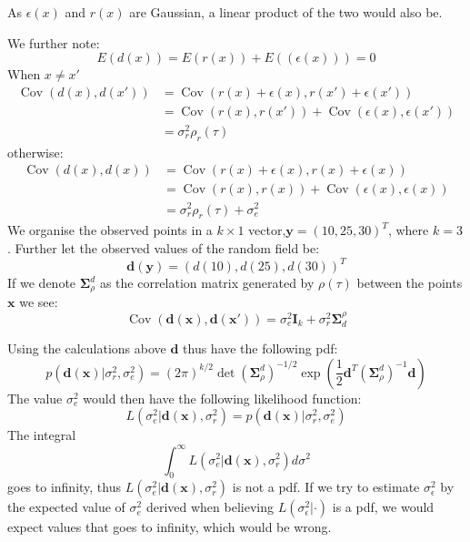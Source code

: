 \documentclass[]{article}
\newcommand{\vect}[1]{\ensuremath{\boldsymbol{\mathbf{#1}}}}
\newcommand{\matr}[1]{\ensuremath{\boldsymbol{\mathbf{#1}}}}
\DeclareMathOperator{\Cov}{\text{Cov}}
\begin{document}
As \(\epsilon(x)\) and \(r(x)\) are Gaussian, a linear product of the
two would also be.

We further note: \begin{equation}
    E(d(x)) = E(r(x)) + E((\epsilon(x))) = 0
\end{equation} When \(x\neq x'\) \begin{equation*}
    \begin{split}
        \Cov(d(x), d(x')) &= \Cov(r(x)+\epsilon(x), r(x') + \epsilon(x')) \\
        &= \Cov(r(x), r(x')) + \Cov(\epsilon(x), \epsilon(x')) \\
        &= \sigma_r^2\rho_r(\tau)
    \end{split}
\end{equation*} otherwise: \begin{equation}
    \begin{split}
        \Cov(d(x), d(x)) &= \Cov(r(x)+\epsilon(x), r(x) + \epsilon(x)) \\ 
        &= \Cov(r(x), r(x)) + \Cov(\epsilon(x), \epsilon(x)) \\
        &= \sigma_r^2\rho_r(\tau) + \sigma_e^2
    \end{split}
\end{equation} We organise the observed points in a \(k \times 1\)
vector,\(\vect y = (10, 25, 30)^T\), where \(k = 3\). Further let the
observed values of the random field be: \begin{equation}
    \vect d(\vect y) = ( d(10), d(25), d(30))^T
\end{equation} If we denote \(\matr \Sigma_\rho^d\) as the correlation
matrix generated by \(\rho(\tau)\) between the points \(\vect x\) we
see: \begin{equation}
    \Cov(\vect d(\vect x), \vect d(\vect x')) = \sigma^2_e \matr I_k +\sigma^2_r\matr \Sigma^\rho_d
\end{equation}

Using the calculations above \(\vect d\) thus have the following pdf:
\begin{equation}
    p(\vect d(\vect x)|\sigma_r^2, \sigma_e^2) = (2\pi)^{k/2}\det(\matr \Sigma_\rho^d)^{-1/2}\exp(\frac{1}{2}\vect d^T(\matr\Sigma_\rho^d)^{-1}\vect d)
\end{equation} The value \(\sigma_e^2\) would then have the following
likelihood function: \begin{equation}
    L(\sigma_e^2 | \vect d(\vect x), \sigma_r^2)=p(\vect d(\vect x)|\sigma_r^2, \sigma_e^2)
\end{equation} The integral \begin{equation}
    \int_{0}^{\infty}L(\sigma_e^2 | \vect d(\vect x), \sigma_r^2)d\sigma^2
\end{equation} goes to infinity, thus
\(L(\sigma_e^2 | \vect d(\vect x), \sigma_r^2)\) is not a pdf. If we try
to estimate \(\sigma^2_\epsilon\) by the expected value of
\(\sigma_e^2\) derived when believing \(L(\sigma^2_\epsilon|\cdot)\) is
a pdf, we would expect values that goes to infinity, which would be
wrong.
\end{document}
